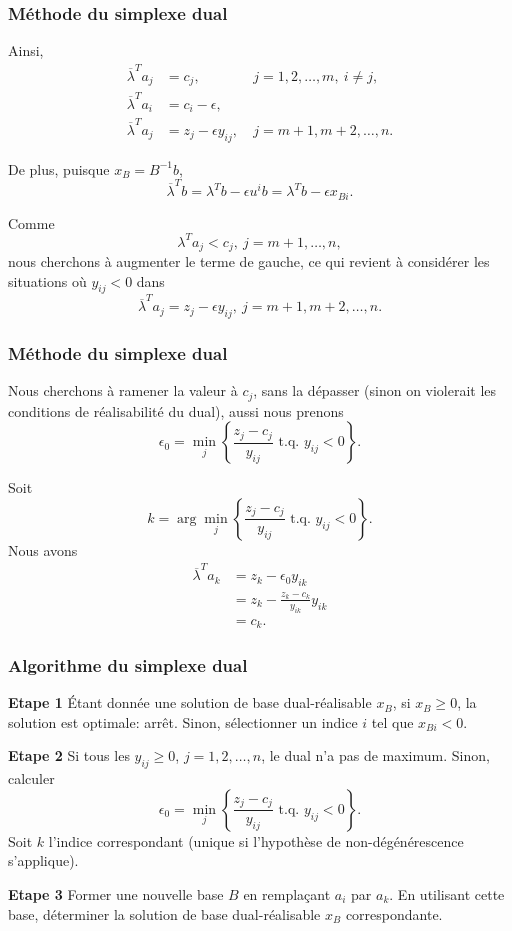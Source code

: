 \documentclass[usepdftitle=false]{beamer}
\begin{document}
\begin{frame}
	\frametitle{Méthode du simplexe dual}
	
	Ainsi,
	\begin{align*}
		\overline{\lambda}^T a_j &= c_j, &\ j = 1,2,\ldots, m,\ i \ne j, \\
		\overline{\lambda}^T a_i &= c_i - \epsilon, \\
		\overline{\lambda}^T a_j &= z_j - \epsilon y_{ij}, &\ j = m+1,m+2,\ldots, n.
	\end{align*}
	
	De plus, puisque $x_B = B^{-1}b$,
	\[
	\overline{\lambda}^T b = 
	\lambda^T b - \epsilon u^i b = 
	\lambda^T b - \epsilon x_{Bi}.
	\]
	
	\mbox{}
	
	Comme
	\[
	\lambda^T a_j < c_j,\ j = m+1, \ldots, n,
	\]
	nous cherchons à augmenter le terme de gauche, ce qui revient à considérer les situations où $y_{ij} < 0$ dans
	\[
	\overline{\lambda}^T a_j = z_j - \epsilon y_{ij}, \ j = m+1,m+2,\ldots, n.
	\]
	
\end{frame}

\begin{frame}
	\frametitle{Méthode du simplexe dual}
	
	Nous cherchons à ramener la valeur à $c_j$, sans la dépasser (sinon on violerait les conditions de réalisabilité du dual), aussi nous prenons
	\[
	\epsilon_0 = \min_j \left\lbrace \frac{z_j-c_j}{y_{ij}}\mbox{ t.q. } y_{ij} < 0 \right\rbrace.
	\]
	
	\mbox{}
	
	Soit
	\[
	k = \arg\min_j \left\lbrace \frac{z_j-c_j}{y_{ij}}\mbox{ t.q. } y_{ij} < 0 \right\rbrace.
	\]
	Nous avons
	\begin{align*}
		\overline{\lambda}^T a_k &= z_k - \epsilon_0 y_{ik} \\
		&= z_k - \frac{z_k-c_k}{y_{ik}} y_{ik} \\
		& = c_k. 
	\end{align*}
	
\end{frame}

\begin{frame}
	\frametitle{Algorithme du simplexe dual}
	
	{\bf Etape 1}
	\'Etant donnée une solution de base dual-réalisable $x_B$, si $x_B \geq 0$, la solution est optimale: arrêt. Sinon, sélectionner un indice $i$ tel que $x_{Bi} < 0$.
	
	\mbox{}
	
	{\bf Etape 2}
	Si tous les $y_{ij} \geq 0$, $j = 1, 2,\ldots,n$, le dual n'a pas de maximum.
	Sinon, calculer
	\[
	\epsilon_0 = \min_j \left\lbrace \frac{z_j-c_j}{y_{ij}}\mbox{ t.q. } y_{ij} < 0 \right\rbrace.
	\]
	Soit $k$ l'indice correspondant (unique si l'hypothèse de non-dégénérescence s'applique).
	
	\mbox{}
	
	{\bf Etape 3}
	Former une nouvelle base $B$ en remplaçant $a_i$ par $a_k$.
	En utilisant cette base, déterminer la solution de base dual-réalisable $x_B$ correspondante.
	
\end{frame}
\end{document}
